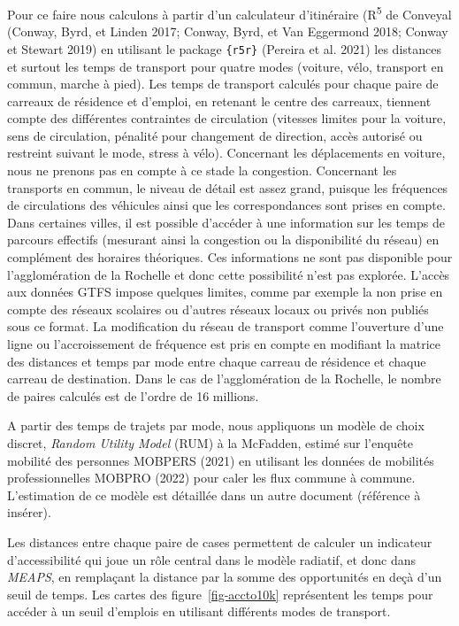 \documentclass[
  10pt,
  a4paper,
  numbers=noendperiod,
  DIV=9]{scrartcl}
\begin{document}
Pour ce faire nous calculons à partir d'un calculateur d'itinéraire
(R\textsuperscript{5} de Conveyal (Conway, Byrd, et Linden 2017; Conway,
Byrd, et Van Eggermond 2018; Conway et Stewart 2019) en utilisant le
package \texttt{\{r5r\}} (Pereira et al. 2021) les distances et surtout
les temps de transport pour quatre modes (voiture, vélo, transport en
commun, marche à pied). Les temps de transport calculés pour chaque
paire de carreaux de résidence et d'emploi, en retenant le centre des
carreaux, tiennent compte des différentes contraintes de circulation
(vitesses limites pour la voiture, sens de circulation, pénalité pour
changement de direction, accès autorisé ou restreint suivant le mode,
stress à vélo). Concernant les déplacements en voiture, nous ne prenons
pas en compte à ce stade la congestion. Concernant les transports en
commun, le niveau de détail est assez grand, puisque les fréquences de
circulations des véhicules ainsi que les correspondances sont prises en
compte. Dans certaines villes, il est possible d'accéder à une
information sur les temps de parcours effectifs (mesurant ainsi la
congestion ou la disponibilité du réseau) en complément des horaires
théoriques. Ces informations ne sont pas disponible pour l'agglomération
de la Rochelle et donc cette possibilité n'est pas explorée. L'accès aux
données GTFS impose quelques limites, comme par exemple la non prise en
compte des réseaux scolaires ou d'autres réseaux locaux ou privés non
publiés sous ce format. La modification du réseau de transport comme
l'ouverture d'une ligne ou l'accroissement de fréquence est pris en
compte en modifiant la matrice des distances et temps par mode entre
chaque carreau de résidence et chaque carreau de destination. Dans le
cas de l'agglomération de la Rochelle, le nombre de paires calculés est
de l'ordre de 16 millions.

A partir des temps de trajets par mode, nous appliquons un modèle de
choix discret, \emph{Random Utility Model} (RUM) à la McFadden, estimé
sur l'enquête mobilité des personnes MOBPERS (2021) en utilisant les
données de mobilités professionnelles MOBPRO (2022) pour caler les flux
commune à commune. L'estimation de ce modèle est détaillée dans un autre
document (référence à insérer).

Les distances entre chaque paire de cases permettent de calculer un
indicateur d'accessibilité qui joue un rôle central dans le modèle
radiatif, et donc dans \emph{MEAPS}, en remplaçant la distance par la
somme des opportunités en deçà d'un seuil de temps. Les cartes des
figure~\ref{fig-accto10k} représentent les temps pour accéder à un seuil
d'emplois en utilisant différents modes de transport.
\end{document}
